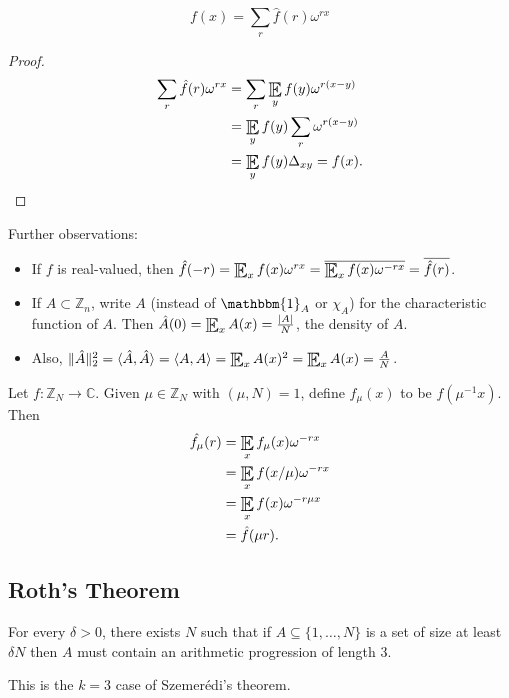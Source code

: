 \documentclass{article}
\DeclareMathOperator*{\E}{\scalerel*{\mathbb{E}}{\textstyle\sum}}
\newcommand{\1}[1]{\mathbbm{1}_{#1}}
\begin{document}
\begin{nlemma}\label{lem:3}
  \begin{equation*}
    f(x) = \sum_r \hat{f}(r) \omega^{r x}
  \end{equation*}
\end{nlemma}
\begin{proof}
  \begin{align*}
    \sum_r \hat{f}(r) \omega^{r x} &= \sum_r \E_y f(y) \omega^{r (x-y)} \\
                                   &= \E_y f(y) \sum_r \omega^{r (x-y)} \\
                                   &= \E_y f(y) \Delta_{x y} = f(x). \qedhere
  \end{align*}
\end{proof}

Further observations:
\begin{itemize}
  \item If $f$ is real-valued, then $\hat{f}(-r) = \E_x f(x) \omega^{r x} = \overline{\E_x f(x) \omega^{- r x}} = \overline{\hat{f}(r)}$.
  \item If $A \subset \mathbb{Z}_n$, write $A$ (instead of $\1{A}$ or $\chi_A$) for the characteristic function of $A$.
    Then $\hat{A}(0) = \E_x A(x) = \frac{|A|}{N}$, the density of $A$.
  \item Also, $\|\hat{A}\|^2_2 = \langle \hat{A}, \hat{A} \rangle = \langle A, A \rangle = \E_x A(x)^2 = \E_x A(x) = \frac{A}{N}$.
\end{itemize}

Let $f : \mathbb{Z}_N \to \mathbb{C}$. Given $\mu \in \mathbb{Z}_N$ with $(\mu,N) = 1$, define $f_\mu(x)$ to be $f(\mu^{-1}x)$.
Then
\begin{align*}
  \hat{f_\mu}(r) &= \E_x f_\mu(x) \omega^{-r x} \\
                 &= \E_x f(x / \mu) \omega^{-r x}  \\
                 &= \E_x f(x) \omega^{- r \mu x}  \\
                 &= \hat{f}(\mu r).
\end{align*}

\subsection{Roth's Theorem}
\begin{nthm}\label{thm:1.4}
  For every $\delta > 0$, there exists $N$ such that if $A \subseteq \{1, \dotsc, N\}$ is a set of size at least $\delta N$ then $A$ must contain an arithmetic progression of length 3.
\end{nthm}
This is the $k=3$ case of Szemer\'{e}di's theorem.
\end{document}

